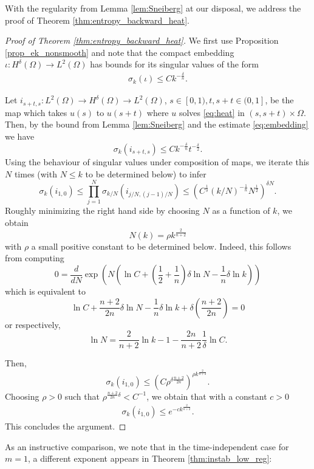 \documentclass[12pt,twoside]{amsart}
\numberwithin{equation}{section}
\renewcommand{\le}{\leqslant}
\renewcommand{\leq}{\leqslant}
\begin{document}
With the regularity from Lemma \ref{lem:Sneiberg} at our disposal, we address the proof of Theorem \ref{thm:entropy_backward_heat}.

\begin{proof}[Proof of Theorem \ref{thm:entropy_backward_heat}]
  
We first use Proposition \ref{prop_ek_nonsmooth} and note that the compact embedding $\iota: H^\delta (\Omega) \to L^2 (\Omega)$ has bounds for its singular values of the form
\begin{align}
\label{eq:embedding}
\sigma_k(\iota) \leq C k^{-\frac{\delta}n} .
\end{align}

  Let $i_{s+t,s}: L^2(\Omega) \to H^{\delta}(\Omega) \to L^2(\Omega)$, $s \in [0,1), t, s+t \in (0,1]$, be the map which takes $u(s)$ to $u(s+t)$ where $u$ solves \eqref{eq:heat} in $(s,s+t) \times \Omega$.
Then, by the bound from Lemma \ref{lem:Sneiberg} and the estimate \eqref{eq:embedding} we have
  \[ \sigma_k(i_{s+t,s}) \le C k^{-\frac{\delta}n} t^{-\frac{\delta}2}.  \]
  Using the behaviour of singular values under composition of maps, we iterate this $N$ times (with $N\leq k$ to be determined below) to infer
  \[ \sigma_k(i_{1,0}) \le \prod_{j=1}^{N} \sigma_{k/N} ( i_{j/N, (j-1)/N})
  \le ( C^{\frac1{\delta} } (k/N)^{-\frac1n} N^{\frac{1}2} )^{\delta N}.
  \]
Roughly minimizing the right hand side by choosing $N$ as a function of $k$, we obtain
  \[ N(k) = \rho  k^{\frac{2}{n+2}} \]
with $\rho$ a small positive constant to be determined below. Indeed, this follows from computing
    \[ 0 = \frac{d}{dN} \exp( N ( \ln C +(\frac{1}2+ \frac1n) \delta \ln N  - \frac1n \delta \ln k )) \]
  which is equivalent to
  \[  \ln C + \frac{n+2}{2n}  \delta \ln N - \frac1n \delta \ln k + \delta (\frac{n+2}{2n}) = 0        \]
or respectively,
  \[ \ln N = \frac{2}{n+2} \ln k - 1 - \frac{2n}{n+2} \frac{1}{\delta} \ln C. \]

  
Then,
\[ \sigma_k(i_{1,0}) \le \left( C \rho^{\delta \frac{n+2}{2n}} \right)^{\rho  k^{\frac{2}{n+2}}}.    \]    
Choosing $\rho>0$ such that $ \rho^{\frac{n+2}{2n}\delta} < C^{-1}$, we obtain that with a constant $c > 0$ 
\begin{align}
\label{eq:entropy}
 \sigma_k(i_{1,0}) \le e^{-c k^{\frac{2}{n+2}}} .  
\end{align} 
This concludes the argument.
\end{proof} 


As an instructive comparison, we note that in the time-independent case for $m=1$, a different exponent appears in Theorem \ref{thm:instab_low_reg}:
\end{document}
